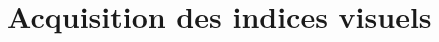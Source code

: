 \documentclass[11pt, a4paper]{book}
\begin{document}
	
\setcounter{tocdepth}{3}

\dominitoc%
\tableofcontents

\setcounter{chapter}{2}

\chapter{Acquisition des indices visuels}




\end{document}
